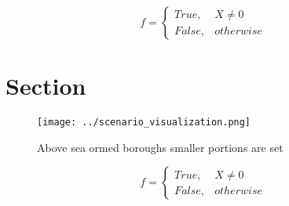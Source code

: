 \documentclass[a4paper]{article}
\begin{document}
\begin{equation}   f =
\begin{cases} True, & X \neq 0\\
False, & otherwise
\end{cases}
\end{equation}

\section{Section}

\begin{figure}
\centering
\texttt{[image: ../scenario\_visualization.png]}
\caption{Above sea ormed boroughs smaller portions are set
}
\end{figure}
 
\begin{equation}   f =
\begin{cases} True, & X \neq 0\\
False, & otherwise
\end{cases}
\end{equation}
\end{document}
